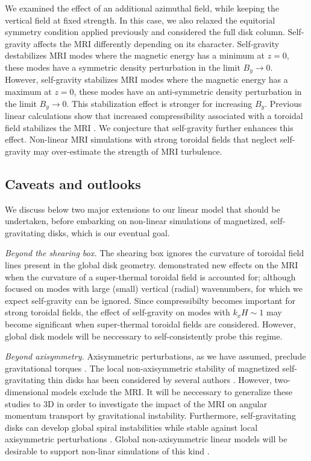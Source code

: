We examined the effect of an additional azimuthal field, while
keeping the vertical field at fixed strength. In this case, we also
relaxed the equitorial symmetry condition applied previously and
considered the full disk column. Self-gravity affects the MRI
differently depending on its character. 
Self-gravity destabilizes MRI modes where the magnetic
energy has a minimum at $z=0$, these modes have a symmetric
density perturbation in the limit $B_y\to0$. However, 
self-gravity stabilizes MRI modes where the magnetic energy has a
maximum at $z=0$, these modes have an anti-symmetric density
perturbation in the limit $B_y\to0$. This stabilization effect is
stronger for increasing $B_y$. Previous linear calculations show that 
increased compressibility associated with a toroidal field stabilizes
the MRI \citep{kim03}. We conjecture that self-gravity 
further enhances this effect. Non-linear MRI simulations with strong
toroidal fields that neglect self-gravity may over-estimate the
strength of MRI turbulence.   



\subsection{Caveats and outlooks}
We discuss below two major extensions to our linear model that
should be undertaken, before embarking on non-linear simulations of
magnetized, self-gravitating disks, which is our eventual goal.  

\emph{Beyond the shearing box.} The shearing box ignores the curvature
of toroidal field lines present in the global disk 
geometry. \cite{pessah05} demonstrated new effects on the MRI 
when the curvature of a super-thermal toroidal field is accounted for;
although \citeauthor{pessah05} focused on modes with large (small)
vertical (radial) wavenumbers, for which we expect self-gravity
can be ignored. 
Since compressibilty becomes important for strong
toroidal fields, the effect of self-gravity on modes with $k_xH\sim1$
may become significant when super-thermal toroidal fields are
considered. However, global disk models will be neccessary
to self-consistently probe this regime. 


\emph{Beyond axisymmetry.} Axisymmetric perturbations, as we have
assumed, preclude gravitational torques \citep{lynden-bell72}. 
The local non-axisymmetric stability of magnetized self-gravitating
thin disks has been considered by several authors
\citep{elmegreen87,gammie96b,fan97,kim01}. However, two-dimensional models
exclude the MRI. It will be neccessary to generalize these studies to
3D in order to investigate the impact of the MRI on angular momentum
transport by gravitational instability. Furthermore, self-gravitating
disks can develop global spiral instabilities while stable against local 
axisymmetric perturbations \citep{papaloizou89,papaloizou91}. Global
non-axisymmetric linear models will be desirable to support non-linar
simulations of this kind \citep{fromang04c,fromang05}.    

